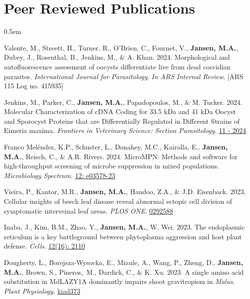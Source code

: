 \documentclass[12pt,a4paper]{article}
\begin{document}
\section*{Peer Reviewed Publications}
	\begin{description}
		\itemsep 0.5em
		
		\item Valente, M., Streett, H., Turner, R., O’Brien, C., Fournet, V., \textbf{Jansen, M.A.}, Dubey, J., Rosenthal, B., Jenkins, M., \& A. Khan. 2024. Morphological and autofluorescence assessment of oocysts differentiate live from dead coccidian parasites. \textit{International Journal for Parasitology}. \textit{In ARS Internal Review}. [ARS 115 Log no. 415935]
		
		\item Jenkins, M., Parker, C., \textbf{Jansen, M.A.}, Papadopoulos, M., \& M. Tucker. 2024. Molecular Characterization of cDNA Coding for 33.5 kDa and 41 kDa Oocyst and Sporocyst Proteins that are Differentially Regulated in Different Strains of Eimeria maxima. \textit{Frontiers in Veterinary Science: Section Parasitology}. \href{https://doi.org/10.3389/fvets.2024.1445646}{11 - 2024}
		
		\item Franco Mel\'{e}ndez, K.P., Schuster, L., Donahey, M.C., Kairalla, E., \textbf{Jansen, M.A.}, Reisch, C., \& A.R. Rivers. 2024. MicroMPN: Methods and software for high-throughput screening of microbe suppression in mixed populations. \textit{Microbiology Spectrum.} \href{https://doi.org/10.1128/spectrum.03578-23}{12: e03578-23}
		
		\item Vieira, P., Kantor, M.R., \textbf{Jansen, M.A.}, Handoo, Z.A., \& J.D. Eisenback. 2023. Cellular insights of beech leaf disease reveal abnormal ectopic cell division of symptomatic interveinal leaf areas. \textit{PLOS ONE}. \href{https://doi.org/10.1371/journal.pone.0292588}{0292588}
		
		\item Inaba, J., Kim, B.M., Zhao, Y., \textbf{Jansen, M.A.}, W. Wei. 2023. The endoplasmic reticulum is a key battleground between phytoplasma aggression and host plant defense. \textit{Cells}. \href{https://doi.org/10.3390/cells12162110}{12(16): 2110}
		
		\item Dougherty, L., Borejsza-Wysocka, E., Miaule, A., Wang, P., Zheng, D., \textbf{Jansen, M.A.}, Brown, S., Pineros,~M., Dardick, C., \& K. Xu. 2023. A single amino acid substitution in MdLAZY1A dominantly impairs shoot gravitropism in \textit{Malus}. \textit{Plant Physiology}. \href{https://doi.org/10.1093/plphys/kiad373}{kiad373}
		

\end{description}
\end{document}
